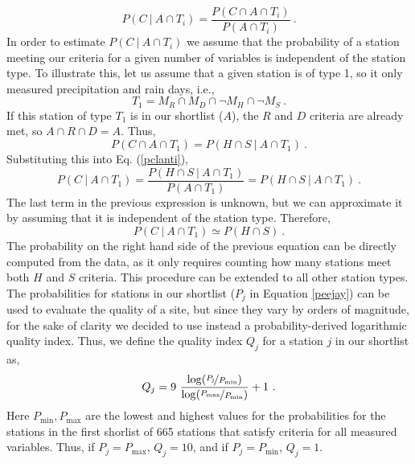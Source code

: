 \documentclass[12pt]{iopart}
\begin{document}
\begin{equation}\label{pclanti}
P(C\ |\ A\cap T_i)=\frac{P(C\cap A\cap T_i)}{P(A\cap T_i)}\  .
\end{equation}
In order to estimate $P(C\ |\ A\cap T_i)$ we assume that the probability of a station meeting our criteria for a given number of variables is independent of the station type. To illustrate this, let us assume that a given station is of type 1, so it only measured precipitation and rain days, i.e.,
\begin{equation}
T_1=M_R\cap M_D\cap\neg M_H\cap\neg M_S\ .
\end{equation}
If this station of type $T_1$ is in our shortlist ($A$), the $R$ and $D$ criteria are already met, so $A\cap R \cap D=A$. Thus,
\begin{equation}
P(C\cap A\cap T_1)=P( H\cap S\ |\ A\cap T_1)\ .
\end{equation}
Substituting this into Eq. (\ref{pclanti}),
\begin{equation}
P(C\ |\ A\cap T_1)=\frac{P( H\cap S\ |\ A\cap T_1)}{P(A\cap T_1)}=P(H\cap S\ |\ A\cap T_1) \ .
\end{equation}
The last term in the previous expression is unknown, but we can approximate it by assuming that it is independent of the station type. Therefore, 
\begin{equation}
P(C\ |\ A\cap T_1)\simeq P(H\cap S)\ .
\end{equation}
The probability on the right hand side of the previous equation can be directly computed from the data, as it only requires counting how many stations meet both $H$ and $S$ criteria. This procedure can be extended to all other station types.\\

The probabilities for stations in our shortlist ($P_j$ in Equation \ref{peejay}) can be used to evaluate the quality of a site, but since they vary by orders of magnitude, for the sake of clarity we decided to use instead a probability-derived logarithmic quality index. Thus, we define the quality index $Q_j$ for a station $j$ in our shortlist as,
\begin{equation}
Q_j=9\ \frac{\log (\nicefrac{P_\mathrm{j}}{P_\mathrm{min}})}{\log (\nicefrac{P_\mathrm{max}}{P_\mathrm{min}})}+1\ .
\end{equation}
Here $P_\mathrm{min},P_\mathrm{max}$ are the lowest and highest values for the probabilities for the stations in the first shorlist of 665 stations that satisfy criteria for all measured variables. Thus, if $P_j=P_\mathrm{max}$, $Q_j=10$, and if $P_j=P_\mathrm{min}$, $Q_j=1$.
\end{document}
